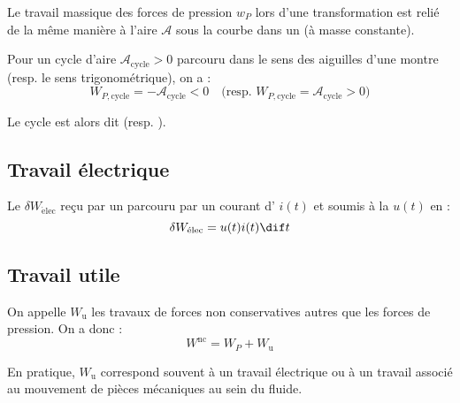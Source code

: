 \begin{remarque}
Le travail massique des forces de pression $w_P$ lors d'une transformation  est relié de la même manière à l'aire $\mathscr{A}$ sous la courbe dans un  (à masse constante).
\end{remarque}

\begin{propriete}
Pour un cycle d'aire $\mathscr{A}_{\mathrm{cycle}} > 0$ parcouru dans le sens des aiguilles d'une montre (resp. le sens trigonométrique), on a :
\[W_{P, \mathrm{cycle}} = -\mathscr{A}_{\mathrm{cycle}} < 0 \quad \text{(resp. } W_{P, \mathrm{cycle}} = \mathscr{A}_{\mathrm{cycle}} > 0 \text{)}\]

\begin{figure}[H]
\begin{center}
\end{center}
\end{figure}

\noindent Le cycle est alors dit  (resp. ).
\end{propriete}



\subsection{Travail électrique}

\begin{propriete}
Le  $\delta W_{\mathrm{\acute elec}}$ reçu par un  parcouru par un courant d' $i(t)$ et soumis à la  $u(t)$ en  :
\[\delta W_{\mathrm{\acute elec}} = u(t) i(t) \dif t\]
\end{propriete}



\subsection{Travail utile}

\begin{definition}
On appelle  $W_{\mathrm{u}}$ les travaux de forces non conservatives autres que les forces de pression. On a donc :
\[W^{\mathrm{nc}} = W_P + W_{\mathrm{u}}\]
\end{definition}

\begin{remarque}
En pratique, $W_{\mathrm{u}}$ correspond souvent à un travail électrique ou à un travail associé au mouvement de pièces mécaniques au sein du fluide.
\end{remarque}